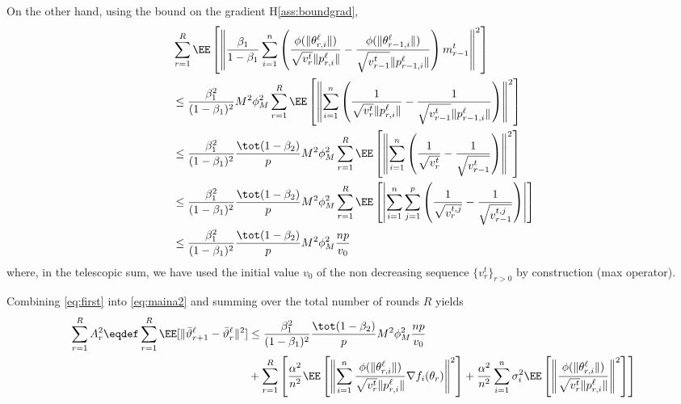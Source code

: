 \documentclass{article}
\begin{document}
On the other hand, using the bound on the gradient H\ref{ass:boundgrad},
\begin{align}\label{eq:first}
\begin{split}
& \sum_{r=1}^R \EE \left[ \left\| \frac{ \beta_1}{1-\beta_1}  \sum_{i = 1}^n  \left( \frac{\phi(\|\theta_{r,i}^{\ell}\|)}{\sqrt{v^{t}_{r}} \|p_{r,i}^{\ell}\|} - \frac{\phi(\|\theta_{r-1,i}^{\ell}\|)}{\sqrt{v^{t}_{r-1}} \|p_{r-1,i}^{\ell}\|} \right) m^{t}_{r-1}\right\|^2 \right]  \\
& \leq   \frac{ \beta_1^2}{(1-\beta_1)^2} M^2 \phi^2_M \sum_{r=1}^R  \EE \left[  \left\| \sum_{i = 1}^n  \left( \frac{1}{\sqrt{v^{t}_{r}} \|p_{r,i}^{\ell}\|} - \frac{1}{\sqrt{v^{t}_{r-1}} \|p_{r-1,i}^{\ell}\|} \right) \right\|^2 \right]\\
& \leq   \frac{ \beta_1^2}{(1-\beta_1)^2} \frac{\tot(1-\beta_2)}{ p}  M^2 \phi^2_M \sum_{r=1}^R  \EE \left[  \left\| \sum_{i = 1}^n  \left( \frac{1}{\sqrt{v^{t}_{r}}} - \frac{1}{\sqrt{v^{t}_{r-1}}} \right) \right\|^2 \right]\\
& \leq   \frac{ \beta_1^2}{(1-\beta_1)^2} \frac{\tot(1-\beta_2)}{ p}  M^2 \phi^2_M \sum_{r=1}^R  \EE \left[  \left| \sum_{i = 1}^n  \sum_{j= 1}^p  \left( \frac{1}{\sqrt{v^{t,j}_{r}}} - \frac{1}{\sqrt{v^{t,j}_{r-1}}} \right) \right| \right]\\
& \leq   \frac{ \beta_1^2}{(1-\beta_1)^2} \frac{\tot(1-\beta_2)}{ p}  M^2 \phi^2_M \frac{n p}{v_0}\\
\end{split}
\end{align}
where, in the telescopic sum, we have used the initial value $v_0$ of the non decreasing sequence $\{v^t_r\}_{r >0}$ by construction (max operator).
 
Combining \eqref{eq:first} into \eqref{eq:maina2} and summing over the total number of rounds $R$ yields
\begin{align}\label{eq:finala2}
\begin{split}
\sum_{r=1}^R A_r^2 \eqdef \sum_{r=1}^R \EE[  \| \bar{\vartheta}^\ell_{r+1} - \bar{\vartheta}^\ell_r \|^2] & \leq \frac{ \beta_1^2}{(1-\beta_1)^2} \frac{\tot(1-\beta_2)}{ p}  M^2 \phi^2_M \frac{n p}{v_0} \\
& + \sum_{r=1}^R  \left[  \frac{\alpha^2}{n^2} \EE\left[ \left\| \sum_{i = 1}^n \frac{\phi(\|\theta_{r,i}^{\ell}\|)}{\sqrt{v^{t}_{r}} \|p_{r,i}^{\ell}\|}\nabla f_i(\theta_r) \right\|^2 \right] +  \frac{\alpha^2}{n^2} \sum_{i = 1}^n  \sigma_i^2 \EE\left[ \left\|\frac{\phi(\|\theta_{r,i}^{\ell}\|)}{\sqrt{v^{t}_{r}} \|p_{r,i}^{\ell}\|} \right\|^2 \right]\right]
\end{split}
\end{align}
\end{document}
